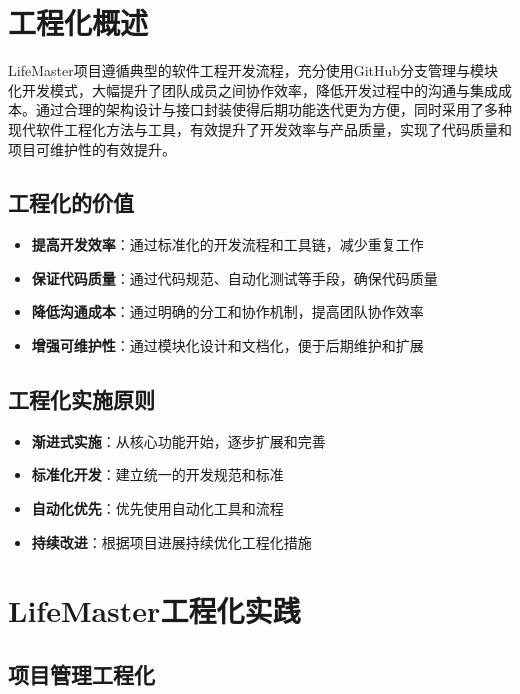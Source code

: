 \documentclass[a4paper]{article}
\begin{document}
\section{工程化概述}

LifeMaster项目遵循典型的软件工程开发流程，充分使用GitHub分支管理与模块化开发模式，大幅提升了团队成员之间协作效率，降低开发过程中的沟通与集成成本。通过合理的架构设计与接口封装使得后期功能迭代更为方便，同时采用了多种现代软件工程化方法与工具，有效提升了开发效率与产品质量，实现了代码质量和项目可维护性的有效提升。

\subsection{工程化的价值}

\begin{itemize}
    \item \textbf{提高开发效率}：通过标准化的开发流程和工具链，减少重复工作
    \item \textbf{保证代码质量}：通过代码规范、自动化测试等手段，确保代码质量
    \item \textbf{降低沟通成本}：通过明确的分工和协作机制，提高团队协作效率
    \item \textbf{增强可维护性}：通过模块化设计和文档化，便于后期维护和扩展
\end{itemize}

\subsection{工程化实施原则}

\begin{itemize}
    \item \textbf{渐进式实施}：从核心功能开始，逐步扩展和完善
    \item \textbf{标准化开发}：建立统一的开发规范和标准
    \item \textbf{自动化优先}：优先使用自动化工具和流程
    \item \textbf{持续改进}：根据项目进展持续优化工程化措施
\end{itemize}

\section{LifeMaster工程化实践}

\subsection{项目管理工程化}
\end{document}
